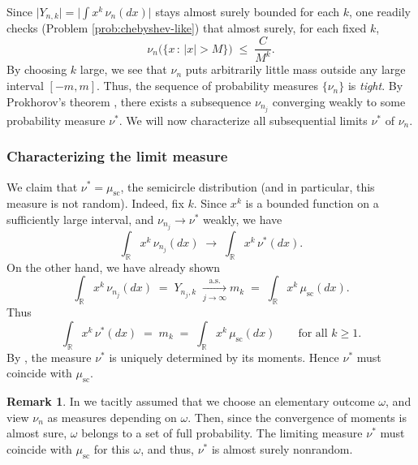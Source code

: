 \documentclass[letterpaper,11pt,oneside,reqno]{article}
\numberwithin{equation}{section}
\theoremstyle{definition}
\newtheorem{remark}[proposition]{Remark}
\begin{document}
Since \(\lvert Y_{n,k}\rvert = \bigl|\int x^k\,\nu_n(dx)\bigr|\) stays
almost surely
bounded for each \(k\), one readily checks
(Problem \ref{prob:chebyshev-like})
that almost surely, for each fixed \(k\),
\begin{equation}
	\label{eq:chebyshev-like}
  \nu_n\bigl(\{x\,:\,|x|>M\}\bigr)
	\;\le\; \frac{C}{M^k}.
\end{equation}
By choosing \(k\) large, we see that \(\nu_n\) puts
arbitrarily little mass outside any large interval
\([-m,m]\).  Thus, the
sequence of probability measures
\(\{\nu_n\}\) is \emph{tight}.
By Prokhorov’s theorem \cite[Theorem~25.10]{billingsley1995probability},
there exists a subsequence \(\nu_{n_j}\) converging weakly to some probability measure \(\nu^*\).
We will now characterize all subsequential limits $\nu^*$ of $\nu_n$.

\subsubsection{Characterizing the limit measure}
\label{subsub:semicircle-characterization}

We claim that \(\nu^*=\mu_{\mathrm{sc}}\), the semicircle distribution
(and in particular, this measure is not random).
Indeed, fix \(k\).  Since \(x^k\) is a bounded function on a sufficiently large interval, and \(\nu_{n_j}\to\nu^*\) weakly, we have
\[
\int_{\mathbb{R}} x^k\,\nu_{n_j}(dx) \;\to\;\int_{\mathbb{R}} x^k\,\nu^*(dx).
\]
On the other hand, we have already shown
\[
\int_{\mathbb{R}} x^k \, \nu_{n_j}(dx)
   \;=\;
   Y_{n_j,k}
   \;\xrightarrow[j\to\infty]{\text{a.s.}}
   m_k
   \;=\;\int_{\mathbb{R}} x^k\,\mu_{\mathrm{sc}}(dx).
\]
Thus
\[
\int_{\mathbb{R}} x^k\,\nu^*(dx)
   \;=\;
   m_k
   \;=\;
   \int_{\mathbb{R}} x^k\,\mu_{\mathrm{sc}}(dx)
   \qquad
   \text{for all $k\ge1$.}
\]
By , the measure \(\nu^*\) is uniquely
determined by its moments.  Hence \(\nu^*\) must coincide
with \(\mu_{\mathrm{sc}}\).

\begin{remark}
	In 
	we tacitly assumed that we choose an elementary outcome $\omega$,
	and view $\nu_n$ as measures depending on $\omega$.
	Then, since the convergence of moments is almost sure,
	$\omega$ belongs to a set of full probability.
	The limiting measure $\nu^*$ must coincide
	with $\mu_{\mathrm{sc}}$ for this $\omega$,
	and thus, $\nu^*$ is almost surely nonrandom.
\end{remark}
\end{document}
